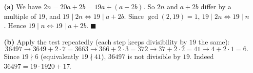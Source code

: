 \textbf{(a)} We have $2n=20a+2b=19a+(a+2b)$. So $2n$ and $a+2b$ differ by a multiple of $19$, and $19\mid2n\iff19\mid a+2b$. Since $\gcd(2,19)=1$, $19\mid 2n\iff19\mid n$. Hence $19\mid n\iff19\mid a+2b$. $\blacksquare$

\textbf{(b)} Apply the test repeatedly (each step keeps divisibility by $19$ the same):
\[
36497\to3649+2\cdot7=3663\to366+2\cdot3=372\to37+2\cdot2=41\to4+2\cdot1=6 .
\]
Since $19\nmid6$ (equivalently $19\nmid41$), $36497$ is $\boxed{\text{not divisible by }19}$. Indeed $36497=19\cdot1920+17$.
